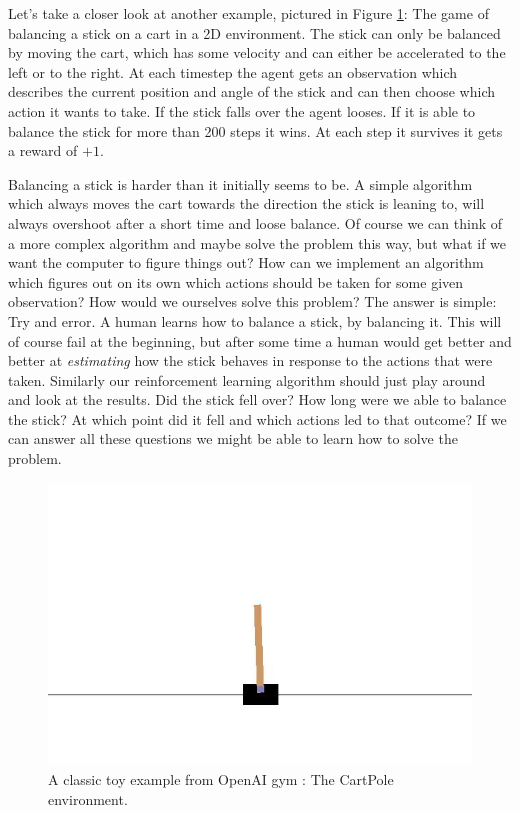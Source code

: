 Let's take a closer look at another example, pictured in Figure \ref{fig:CartPole}: The game of balancing a stick on a cart in a 2D environment. The stick can only be balanced by moving the cart, which has some velocity and can either be accelerated to the left or to the right. At each timestep the agent gets an observation which describes the current position and angle of the stick and can then choose which action it wants to take. If the stick falls over the agent looses. If it is able to balance the stick for more than 200 steps it wins. At each step it survives it gets a reward of $+1$.

Balancing a stick is harder than it initially seems to be. A simple algorithm which always moves the cart towards the direction the stick is leaning to, will always overshoot after a short time and loose balance. Of course we can think of a more complex algorithm and maybe solve the problem this way, but what if we want the computer to figure things out? How can we implement an algorithm which figures out on its own which actions should be taken for some given observation? How would we ourselves solve this problem? The answer is simple: Try and error. A human learns how to balance a stick, by balancing it. This will of course fail at the beginning, but after some time a human would get better and better at \textit{estimating} how the stick behaves in response to the actions that were taken. Similarly our reinforcement learning algorithm should just play around and look at the results. Did the stick fell over? How long were we able to balance the stick? At which point did it fell and which actions led to that outcome? If we can answer all these questions we might be able to learn how to solve the problem.

\begin{figure}[ht]
  
  \begin{center}
      \includegraphics[trim=0px 50px 0px 100px, clip, width=0.6\columnwidth]{figures/rl/CartPole.jpg}
  \end{center}
  
  \caption[CartPole Environment]{A classic toy example from OpenAI gym \cite{openAIgym}: The CartPole environment.}
  \label{fig:CartPole}
\end{figure}


